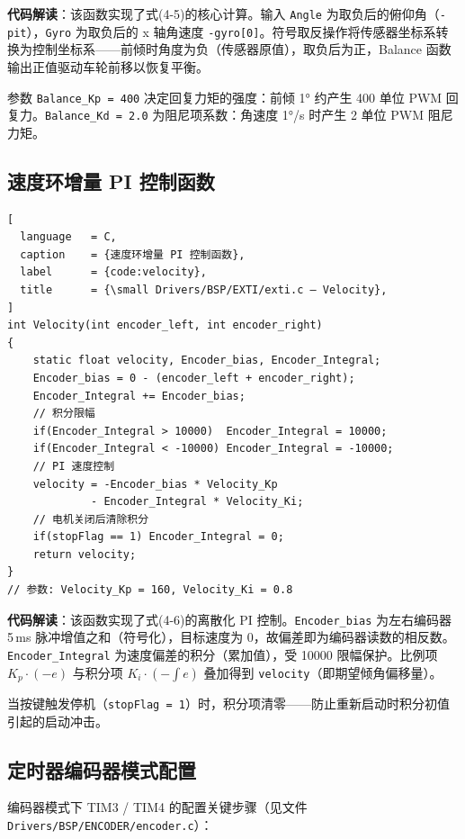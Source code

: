 \documentclass[12pt,a4paper,UTF8]{ctexrep}
\begin{document}
\textbf{代码解读}：该函数实现了式(4-5)的核心计算。输入 \texttt{Angle} 为取负后的俯仰角（\texttt{-pit}），\texttt{Gyro} 为取负后的 x 轴角速度 \texttt{-gyro[0]}。符号取反操作将传感器坐标系转换为控制坐标系——前倾时角度为负（传感器原值），取负后为正，Balance 函数输出正值驱动车轮前移以恢复平衡。

参数 \texttt{Balance\_Kp = 400} 决定回复力矩的强度：前倾 1° 约产生 400 单位 PWM 回复力。\texttt{Balance\_Kd = 2.0} 为阻尼项系数：角速度 1°/s 时产生 2 单位 PWM 阻尼力矩。

\subsection{速度环增量 PI 控制函数}

\begin{lstlisting}[
  language   = C,
  caption    = {速度环增量 PI 控制函数},
  label      = {code:velocity},
  title      = {\small Drivers/BSP/EXTI/exti.c — Velocity},
]
int Velocity(int encoder_left, int encoder_right)
{
    static float velocity, Encoder_bias, Encoder_Integral;
    Encoder_bias = 0 - (encoder_left + encoder_right);
    Encoder_Integral += Encoder_bias;
    // 积分限幅
    if(Encoder_Integral > 10000)  Encoder_Integral = 10000;
    if(Encoder_Integral < -10000) Encoder_Integral = -10000;
    // PI 速度控制
    velocity = -Encoder_bias * Velocity_Kp
             - Encoder_Integral * Velocity_Ki;
    // 电机关闭后清除积分
    if(stopFlag == 1) Encoder_Integral = 0;
    return velocity;
}
// 参数: Velocity_Kp = 160, Velocity_Ki = 0.8
\end{lstlisting}

\textbf{代码解读}：该函数实现了式(4-6)的离散化 PI 控制。\texttt{Encoder\_bias} 为左右编码器 5\,ms 脉冲增值之和（符号化），目标速度为 0，故偏差即为编码器读数的相反数。\texttt{Encoder\_Integral} 为速度偏差的积分（累加值），受 10000 限幅保护。比例项 $K_p \cdot (-e)$ 与积分项 $K_i \cdot (-\int e)$ 叠加得到 \texttt{velocity}（即期望倾角偏移量）。

当按键触发停机（\texttt{stopFlag = 1}）时，积分项清零——防止重新启动时积分初值引起的启动冲击。

\subsection{定时器编码器模式配置}

编码器模式下 TIM3 / TIM4 的配置关键步骤（见文件 \texttt{Drivers/BSP/ENCODER/encoder.c}）：
\end{document}
